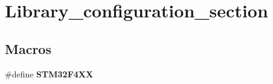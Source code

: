 \hypertarget{group___library__configuration__section}{\section{Library\-\_\-configuration\-\_\-section}
\label{group___library__configuration__section}
}
\subsection*{Macros}
\begin{DoxyCompactItemize}
\item 
\hypertarget{group___library__configuration__section_ga252742cf70ce5210bc8817d386abced6}{\#define {\bfseries S\-T\-M32\-F4\-X\-X}}\label{group___library__configuration__section_ga252742cf70ce5210bc8817d386abced6}


\end{DoxyCompactItemize}
